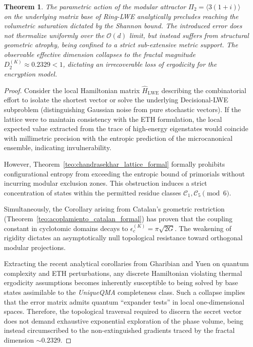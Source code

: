 \documentclass{article}
\numberwithin{equation}{section}
\theoremstyle{plain}
\newtheorem{theorem}{Theorem}[section]
\theoremstyle{definition}
\begin{document}
\begin{theorem}
\label{teo:violacion_eth_lwe_uniqueqma}
The parametric action of the modular attractor $\Pi_2 = \langle 3(1+i) \rangle$ on the underlying matrix base of Ring-LWE analytically precludes reaching the volumetric saturation dictated by the Shannon bound. The introduced error does not thermalize uniformly over the $\mathcal{O}(d)$ limit, but instead suffers from structural geometric atrophy, being confined to a strict sub-extensive metric support. The observable effective dimension collapses to the fractal magnitude $D_2^{(K)} \approx 0.2329 < 1$, dictating an irrecoverable loss of ergodicity for the encryption model.
\end{theorem}

\begin{proof}
Consider the local Hamiltonian matrix $\hat{H}_{\text{LWE}}$ describing the combinatorial effort to isolate the shortest vector or solve the underlying Decisional-LWE subproblem (distinguishing Gaussian noise from pure stochastic vectors). If the lattice were to maintain consistency with the ETH formulation, the local expected value extracted from the trace of high-energy eigenstates would coincide with millimetric precision with the entropic prediction of the microcanonical ensemble, indicating invulnerability.

However, Theorem~\ref{teo:chandrasekhar_lattice_formal} formally prohibits configurational entropy from exceeding the entropic bound of primorials without incurring modular exclusion zones. This obstruction induces a strict concentration of states within the permitted residue classes $\mathcal{C}_1, \mathcal{C}_5 \pmod 6$.

Simultaneously, the Corollary arising from Catalan's geometric restriction (Theorem~\ref{teo:acoplamiento_catalan_formal}) has proven that the coupling constant in cyclotomic domains decays to $\epsilon_c^{(K)} = \pi\sqrt{2G}$. The weakening of rigidity dictates an asymptotically null topological resistance toward orthogonal modular projections.

Extracting the recent analytical corollaries from Gharibian and Yuen on quantum complexity and ETH perturbations, any discrete Hamiltonian violating thermal ergodicity assumptions becomes inherently susceptible to being solved by base states assimilable to the \textit{UniqueQMA} completeness class. Such a collapse implies that the error matrix admits quantum ``expander tests'' in local one-dimensional spaces. Therefore, the topological traversal required to discern the secret vector does not demand exhaustive exponential exploration of the phase volume, being instead circumscribed to the non-extinguished gradients traced by the fractal dimension $\sim 0.2329$.
\end{proof}
\end{document}
